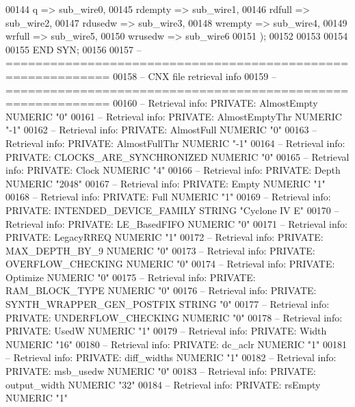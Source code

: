 \begin{DoxyCode}
{00144         q => sub_wire0,
00145         rdempty => sub_wire1,
00146         rdfull => sub_wire2,
00147         rdusedw => sub_wire3,
00148         wrempty => sub_wire4,
00149         wrfull => sub_wire5,
00150         wrusedw => sub_wire6
00151     \textcolor{vhdlchar}{)};
00152 
00153 
00154 
00155 \textcolor{keywordflow}{END} \textcolor{vhdlchar}{SYN};
00156 
00157 \textcolor{keyword}{-- ============================================================}
00158 \textcolor{keyword}{-- CNX file retrieval info}
00159 \textcolor{keyword}{-- ============================================================}
00160 \textcolor{keyword}{-- Retrieval info: PRIVATE: AlmostEmpty NUMERIC "0"}
00161 \textcolor{keyword}{-- Retrieval info: PRIVATE: AlmostEmptyThr NUMERIC "-1"}
00162 \textcolor{keyword}{-- Retrieval info: PRIVATE: AlmostFull NUMERIC "0"}
00163 \textcolor{keyword}{-- Retrieval info: PRIVATE: AlmostFullThr NUMERIC "-1"}
00164 \textcolor{keyword}{-- Retrieval info: PRIVATE: CLOCKS\_ARE\_SYNCHRONIZED NUMERIC "0"}
00165 \textcolor{keyword}{-- Retrieval info: PRIVATE: Clock NUMERIC "4"}
00166 \textcolor{keyword}{-- Retrieval info: PRIVATE: Depth NUMERIC "2048"}
00167 \textcolor{keyword}{-- Retrieval info: PRIVATE: Empty NUMERIC "1"}
00168 \textcolor{keyword}{-- Retrieval info: PRIVATE: Full NUMERIC "1"}
00169 \textcolor{keyword}{-- Retrieval info: PRIVATE: INTENDED\_DEVICE\_FAMILY STRING "Cyclone IV E"}
00170 \textcolor{keyword}{-- Retrieval info: PRIVATE: LE\_BasedFIFO NUMERIC "0"}
00171 \textcolor{keyword}{-- Retrieval info: PRIVATE: LegacyRREQ NUMERIC "1"}
00172 \textcolor{keyword}{-- Retrieval info: PRIVATE: MAX\_DEPTH\_BY\_9 NUMERIC "0"}
00173 \textcolor{keyword}{-- Retrieval info: PRIVATE: OVERFLOW\_CHECKING NUMERIC "0"}
00174 \textcolor{keyword}{-- Retrieval info: PRIVATE: Optimize NUMERIC "0"}
00175 \textcolor{keyword}{-- Retrieval info: PRIVATE: RAM\_BLOCK\_TYPE NUMERIC "0"}
00176 \textcolor{keyword}{-- Retrieval info: PRIVATE: SYNTH\_WRAPPER\_GEN\_POSTFIX STRING "0"}
00177 \textcolor{keyword}{-- Retrieval info: PRIVATE: UNDERFLOW\_CHECKING NUMERIC "0"}
00178 \textcolor{keyword}{-- Retrieval info: PRIVATE: UsedW NUMERIC "1"}
00179 \textcolor{keyword}{-- Retrieval info: PRIVATE: Width NUMERIC "16"}
00180 \textcolor{keyword}{-- Retrieval info: PRIVATE: dc\_aclr NUMERIC "1"}
00181 \textcolor{keyword}{-- Retrieval info: PRIVATE: diff\_widths NUMERIC "1"}
00182 \textcolor{keyword}{-- Retrieval info: PRIVATE: msb\_usedw NUMERIC "0"}
00183 \textcolor{keyword}{-- Retrieval info: PRIVATE: output\_width NUMERIC "32"}
00184 \textcolor{keyword}{-- Retrieval info: PRIVATE: rsEmpty NUMERIC "1"}
}
\end{DoxyCode}
